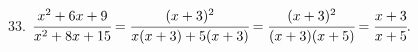 33. $\cfrac{x^2+6x+9}{x^2+8x+15}=\cfrac{(x+3)^2}{x(x+3)+5(x+3)}=\cfrac{(x+3)^2}{(x+3)(x+5)}=\cfrac{x+3}{x+5}.$\\
